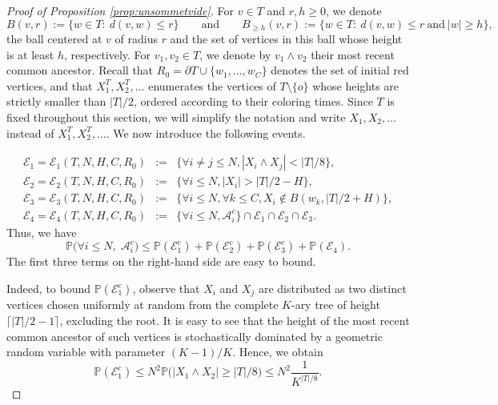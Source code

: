 \documentclass[french]{article}
\renewcommand{\P}{\mathbb{P}}
\newcommand{\Tf}{T}
\renewcommand{\1}{\mathds{1}}
\begin{document}
\begin{proof}[Proof of Proposition \ref{prop:unsommetvide}]

For $v\in \Tf$ and $r,h\ge 0$, we denote
$$
B(v,r):=\{w\in \Tf:\ d(v,w)\le r\}
\qquad \text{and} \qquad
B_{\ge h}(v,r):=\{w\in \Tf:\ d(v,w)\le r \ \text{and}\ |w|\ge h\},
$$
the ball centered at $v$ of radius $r$ and the set of vertices in this ball whose height is at least $h$, respectively.
For $v_1,v_2\in \Tf$, we denote by $v_1\wedge v_2$ their most recent common ancestor.
Recall that $R_0=\partial \Tf \cup\{w_1,\ldots,w_C\}$ denotes the set of initial red vertices, and that $X^{\Tf}_1,X^{\Tf}_2,\ldots$ enumerates the vertices of $\Tf\setminus\{o\}$ whose heights are strictly smaller than $|\Tf|/2$, ordered according to their coloring times. Since $\Tf$ is fixed throughout this section, we will simplify the notation and write $X_1,X_2,\ldots$ instead of $X^{\Tf}_1,X^{\Tf}_2,\ldots$.
We now introduce the following events.



\begin{eqnarray*}
\mathcal{E}_1=\mathcal{E}_1(\Tf,N,H,C,R_0) &:=& \{\forall i\neq j \le N, |X_i\wedge X_j| < |\Tf|/8\},\\
\mathcal{E}_2=\mathcal{E}_2(\Tf,N,H,C,R_0) &:=& \{\forall i \le N, |X_i|> |\Tf|/2-H\},\\
\mathcal{E}_3=\mathcal{E}_3(\Tf,N,H,C,R_0) &:=& \{\forall i \le N, \forall k \le C, X_i\notin B(w_k,|\Tf|/2+H)\},\\
\mathcal{E}_4=\mathcal{E}_4(\Tf,N,H,C,R_0) &:=&\{\forall i \le N, \mathcal{A}_i^c\}\cap  \mathcal{E}_1 \cap  \mathcal{E}_2 \cap  \mathcal{E}_3.
\end{eqnarray*}
Thus, we have
$$
\P\bigl(\forall i \le N,\; \mathcal{A}_i^c\bigr)
\le \P(\mathcal{E}_1^c)+\P(\mathcal{E}_2^c)+\P(\mathcal{E}_3^c)+\P(\mathcal{E}_4).
$$
The first three terms on the right-hand side are easy to bound.

Indeed, to bound $\P(\mathcal{E}_1^c)$, observe that $X_i$ and $X_j$ are distributed as two distinct vertices chosen uniformly at random from the complete $K$-ary tree of height $\lceil |\Tf|/2-1 \rceil$, excluding the root. It is easy to see that the height of the most recent common ancestor of such vertices is stochastically dominated by a geometric random variable with parameter $(K-1)/K$. Hence, we obtain
\begin{equation}\label{eq:E1}
\P(\mathcal{E}_1^c)
\le N^2 \P\bigl( |X_1 \wedge X_2| \ge |\Tf|/8 \bigr)
\le N^2 \frac{1}{K^{|\Tf|/8}}.
\end{equation}


\end{proof}
\end{document}
